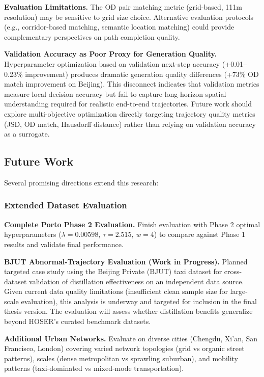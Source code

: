 \textbf{Evaluation Limitations.} The OD pair matching metric (grid-based, 111m resolution) may be sensitive to grid size choice. Alternative evaluation protocols (e.g., corridor-based matching, semantic location matching) could provide complementary perspectives on path completion quality.

\textbf{Validation Accuracy as Poor Proxy for Generation Quality.} Hyperparameter optimization based on validation next-step accuracy (+0.01--0.23\% improvement) produces dramatic generation quality differences (+73\% OD match improvement on Beijing). This disconnect indicates that validation metrics measure local decision accuracy but fail to capture long-horizon spatial understanding required for realistic end-to-end trajectories. Future work should explore multi-objective optimization directly targeting trajectory quality metrics (JSD, OD match, Hausdorff distance) rather than relying on validation accuracy as a surrogate.

\subsection{Future Work}
\label{sec:conclusion-future}

Several promising directions extend this research:

\subsubsection{Extended Dataset Evaluation}

\textbf{Complete Porto Phase 2 Evaluation.} Finish evaluation with Phase 2 optimal hyperparameters ($\lambda = 0.00598$, $\tau = 2.515$, $w = 4$) to compare against Phase 1 results and validate final performance.

\textbf{BJUT Abnormal-Trajectory Evaluation (Work in Progress).} Planned targeted case study using the Beijing Private (BJUT) taxi dataset for cross-dataset validation of distillation effectiveness on an independent data source. Given current data quality limitations (insufficient clean sample size for large-scale evaluation), this analysis is underway and targeted for inclusion in the final thesis version. The evaluation will assess whether distillation benefits generalize beyond HOSER's curated benchmark datasets.

\textbf{Additional Urban Networks.} Evaluate on diverse cities (Chengdu, Xi'an, San Francisco, London) covering varied network topologies (grid vs organic street patterns), scales (dense metropolitan vs sprawling suburban), and mobility patterns (taxi-dominated vs mixed-mode transportation).

